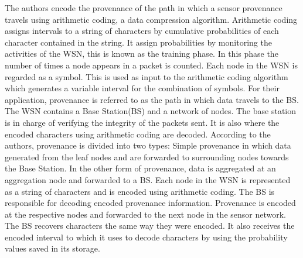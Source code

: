 The authors \cite{hussain_secure_2014} encode the provenance of the path in which a sensor provenance travels using arithmetic coding, a data compression algorithm. Arithmetic coding assigns intervals to a string of characters by  cumulative probabilities of each character contained in the string. It assign probabilities by monitoring the activities of the WSN, this is known as the training phase. In this phase the number of times a node appears in a packet is counted. Each node in the WSN is regarded as a symbol. This is used as input to the arithmetic coding algorithm which generates a variable interval for the combination of symbols. For their application, provenance is referred to as the path in which data travels to the BS. The WSN contains a Base Station(BS) and a network of nodes. The base station is in charge of verifying the integrity of the packets sent. It is also where the encoded characters using arithmetic coding are decoded.  According to the authors, provenance is divided into two types: Simple provenance in which data generated from the leaf nodes and are forwarded to surrounding nodes towards the Base Station. In the other form of provenance, data is aggregated at an aggregation node and forwarded to a BS. Each node in the WSN is represented as a string of characters and is encoded using arithmetic coding. The BS is responsible for decoding encoded provenance information. Provenance is encoded at the respective nodes and forwarded to the next node in the sensor network. The BS recovers characters the same way they were encoded. It also receives the encoded interval to which it uses to decode characters by using the probability values saved in its storage.



















